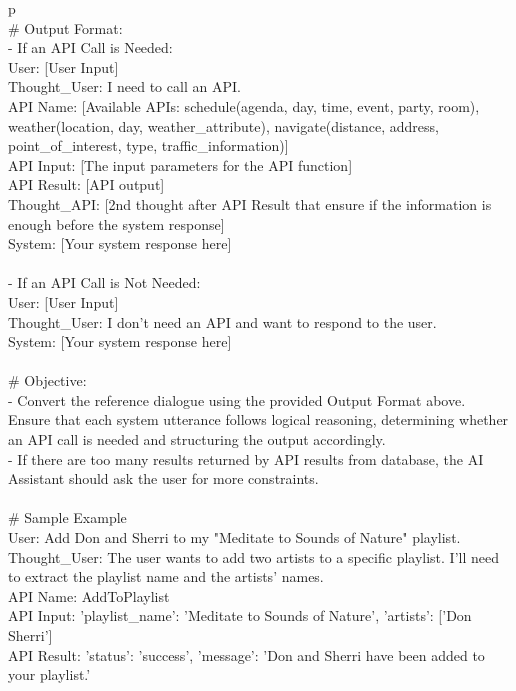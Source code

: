 \begin{table*}
\begin{tabular}{p\linewidth}
 \\
\# Output Format: \\
- If an API Call is Needed: \\
\quad	User: [User Input] \\
\quad    Thought\_User: I need to call an API. \\
\quad    API Name: [Available APIs: schedule(agenda, day, time, event, party, room), weather(location, day, weather\_attribute), navigate(distance, address, point\_of\_interest, type, traffic\_information)] \\
\quad    API Input: [The input parameters for the API function] \\
 \quad   API Result: [API output] \\
 \quad   Thought\_API: [2nd thought after API Result that ensure if the information is enough before the system response] \\
\quad	System: [Your system response here] \\
 \\
- If an API Call is Not Needed: \\
\quad	User: [User Input] \\
 \quad   Thought\_User: I don't need an API and want to respond to the user. \\
 \quad   System: [Your system response here] \\
 \\
\# Objective:  \\
- Convert the reference dialogue using the provided Output Format above. Ensure that each system utterance follows logical reasoning, determining whether an API call is needed and structuring the output accordingly. \\
- If there are too many results returned by API results from database, the AI Assistant should ask the user for more constraints. \\
 \\
\# Sample Example \\
User: Add Don and Sherri to my "Meditate to Sounds of Nature" playlist.   \\
Thought\_User: The user wants to add two artists to a specific playlist. I'll need to extract the playlist name and the artists' names.   \\
API Name: AddToPlaylist   \\
API Input: {'playlist\_name': 'Meditate to Sounds of Nature', 'artists': ['Don Sherri']}   \\
API Result: {'status': 'success', 'message': 'Don and Sherri have been added to your playlist.'}   \\

\end{tabular}
\end{table*}
